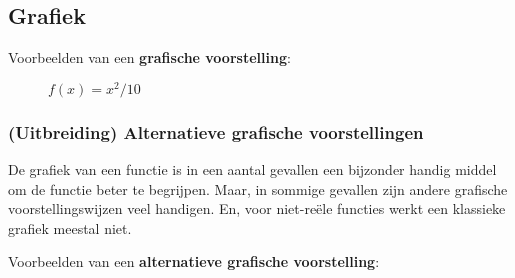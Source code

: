 \documentclass{ximera}
\begin{document}
\subsection{Grafiek}
Voorbeelden van een \textbf{grafische voorstelling}:


\begin{figure}%
    \centering
    \begin{minipage}{0.45\textwidth}
        \centering



        \caption{$f(x) = x + 5$}
    \end{minipage}\hfill
    \begin{minipage}{0.45\textwidth}
        \centering


        \caption{$f(x) = x^2/10$}
    \end{minipage}
\end{figure}


\subsubsection{(Uitbreiding) Alternatieve grafische voorstellingen}

De grafiek van een functie is in een aantal gevallen een bijzonder handig middel om de functie beter te begrijpen. Maar, in sommige gevallen zijn andere grafische voorstellingswijzen veel handigen. En, voor niet-reële functies werkt een klassieke grafiek meestal niet.

Voorbeelden van een \textbf{alternatieve grafische voorstelling}:
\end{document}
